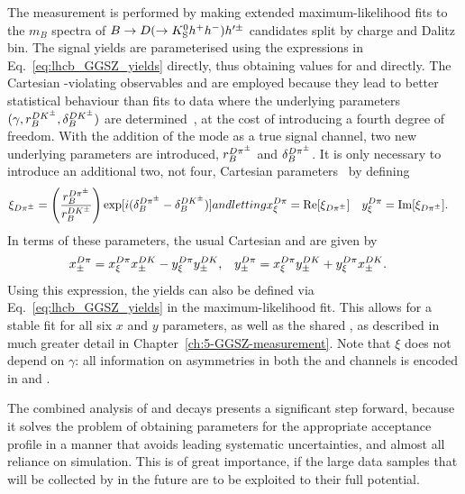 The measurement is performed by making extended maximum-likelihood fits to the $m_B$ spectra of ${B}\rightarrow{\ensuremath{D}}(\rightarrow{\ensuremath{{K}^0_{\mathrm{S}}}} h^+h^-)h'^\pm$ candidates split by charge and Dalitz bin. The \BtoDK signal yields are parameterised using the expressions in Eq.~\eqref{eq:lhcb_GGSZ_yields} directly, thus obtaining values for \xpmdk and \ypmdk directly. The Cartesian \CP-violating observables \xpm and \ypm are employed because they lead to better statistical behaviour than fits to data where the underlying parameters $(\gamma, r_B^{{D}{{K}^\pm}}, \delta_B^{{D}{{K}^\pm}})$ are determined~\cite{}, at the cost of introducing a fourth degree of freedom. With the addition of the \BtoDpi mode as a true signal channel, two new underlying parameters are introduced, $r_B^{{{D}{{\pi}^\pm}}}$ and $\delta_B^{{{D}{{\pi}^\pm}}}$. It is only necessary to introduce an additional two, not four, Cartesian parameters~\cite{Tico:2018qmg} by defining
\begin{subequations}
\begin{align}
    \xi_{\DPi} = \left(\frac{r_B^{\DPi}}{r_B^{\DK}}\right)\exp [i (\delta_B^{\DPi}-\delta_B^{\DK})]
\end{align}
and letting
\begin{align}
    \xxidpi &= \Re [\xi_{\Dpi}] & \yxidpi &= \Im [\xi_{\Dpi}].
\end{align}
\end{subequations}
In terms of these parameters, the usual Cartesian \xpm and \ypm are given by
\begin{align}\label{eq:xy_from_xi}
    x_\pm^{{D}\pi} &= x_\xi^{{D}\pi}x_\pm^{DK} - y_\xi^{{D}\pi}y_\pm^{DK}, 
    & y_\pm^{{D}\pi} &= x_\xi^{{D}\pi}y_\pm^{DK} + y_\xi^{{D}\pi}x_\pm^{DK}.
\end{align} 
Using this expression, the \BtoDpi yields can also be defined via Eq.~\eqref{eq:lhcb_GGSZ_yields} in the maximum-likelihood fit. This allows for a stable fit for all six $x$ and $y$ parameters, as well as the shared \Fi, as described in much greater detail in Chapter~\ref{ch:5-GGSZ-measurement}. Note that $\xi$ does not depend on $\gamma$: all information on \CP asymmetries in both the \BtoDK and \BtoDpi channels is encoded in \xpmdk and \ypmdk. 

The combined analysis of \BtoDK and \BtoDpi decays presents a significant step forward, because it solves the problem of obtaining \Fi parameters for the appropriate acceptance profile in a manner that avoids leading systematic uncertainties, and almost all reliance on simulation. This is of great importance, if the large data samples that will be collected by \lhcb in the future are to be exploited to their full potential.






